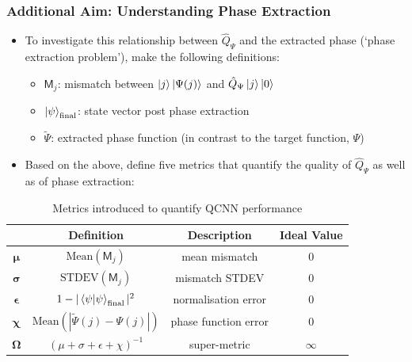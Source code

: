 \documentclass{beamer}
\begin{document}
\begin{frame}
\frametitle{Additional Aim: Understanding Phase Extraction}
\begin{itemize}
\item To investigate this relationship between $\hat{Q}_\Psi$ and the extracted phase (`\alert{phase extraction problem}'), make the following definitions:
\begin{itemize}
\item $\mathsf{M}_j$:  mismatch between $\ket{j} \ket{\Psi(j)}$ and $\hat{Q}_\Psi \ket{j}\ket{0}$
\item $\ket{\psi}_\text{final}$: state vector post phase extraction 
\item $\tilde{\Psi}$: extracted phase function  (in contrast to the target function, $\Psi$)
\end{itemize}
\item Based on the above, define \alert{five metrics} that quantify the quality of $\hat{Q}_\Psi$ as well as of phase extraction:
\end{itemize}

\begin{table}
\begin{tabular}{c | c | c | c}
& \textbf{Definition} & \textbf{Description} & \textbf{Ideal Value} \\ \hline 
$\boldsymbol{\mu}$ & $\text{Mean}(\mathsf{M}_j)$ & mean mismatch & 0  \\
$\boldsymbol{\sigma}$ &  $\text{STDEV}(\mathsf{M}_j)$ & mismatch STDEV & 0  \\
$\boldsymbol{\epsilon}$ & $1 - |\braket{\psi | \psi}_\text{final}|^2$ & normalisation error & 0 \\ 
$\boldsymbol{\chi}$ &  $\text{Mean}(|\tilde{\Psi}(j) - \Psi(j)|)$ & phase function error & 0 \\
$\boldsymbol{\Omega}$ & $\left( \mu + \sigma + \epsilon + \chi \right)^{-1}$ & super-metric & $\infty$
\end{tabular}
\caption{Metrics introduced to quantify QCNN performance}
\end{table}

\end{frame}
\end{document}
